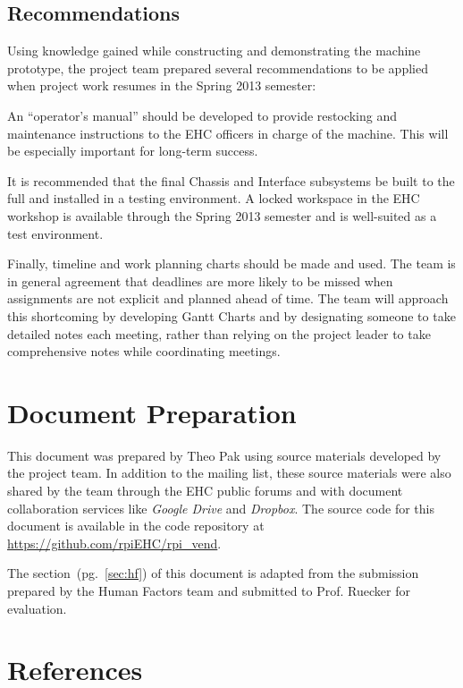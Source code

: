\documentclass[12pt,oneside,final]{article}
\begin{document}
\subsection{Recommendations}
Using knowledge gained while constructing and demonstrating the machine prototype, the project team prepared several recommendations to be applied when project work resumes in the Spring 2013 semester:

An ``operator's manual'' should be developed to provide restocking and maintenance instructions to the EHC officers in charge of the machine. This will be especially important for long-term success.

It is recommended that the final Chassis and Interface subsystems be built to the full  and installed in a testing environment. A locked workspace in the EHC workshop is available through the Spring 2013 semester and is well-suited as a test environment.

Finally, timeline and work planning charts should be made and used. The team is in general agreement that deadlines are more likely to be missed when assignments are not explicit and planned ahead of time. The team will approach this shortcoming by developing Gantt Charts and by designating someone to take detailed notes each meeting, rather than relying on the project leader to take comprehensive notes while coordinating meetings.


\appendix

\section{Document Preparation}
This document was prepared by Theo Pak using source materials developed by the project team. In addition to the mailing list, these source materials were also shared by the team through the EHC public forums and with document collaboration services like \emph{Google Drive} and \emph{Dropbox}. The source code for this document is available in the code repository at \url{https://github.com/rpiEHC/rpi_vend}.

The \emph{} section~(pg.~\ref{sec:hf}) of this document is adapted from the submission prepared by the Human Factors team and submitted to Prof. Ruecker for evaluation.


\section{References}
\label{ref:refs}
\end{document}
